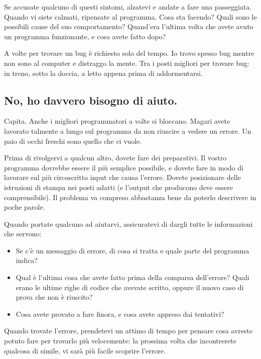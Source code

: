 \documentclass[10pt]{book}
\begin{document}
Se accusate qualcuno di questi sintomi, alzatevi e andate a fare una passeggiata. Quando vi siete calmati, ripensate al programma. Cosa sta facendo? Quali sono le possibili cause del suo comportamento? Quand'era l'ultima volta che avete avuto un programma funzionante, e cosa avete fatto dopo?

A volte per trovare un bug è richiesto solo del tempo. Io trovo spesso bug mentre non sono al computer e distraggo la mente. Tra i posti migliori per trovare bug: in treno, sotto la doccia, a letto appena prima di addormentarsi.


\subsection{No, ho davvero bisogno di aiuto.}

Capita. Anche i migliori programmatori a volte si bloccano. Magari avete lavorato talmente a lungo sul programma da non riuscire a vedere un errore. Un paio di occhi freschi sono quello che ci vuole.

Prima di rivolgervi a qualcun altro, dovete fare dei preparativi. Il vostro programma dovrebbe essere il più semplice possibile, e dovete fare in modo di lavorare sul più circoscritto input che causa l'errore.
Dovete posizionare delle istruzioni di stampa nei posti adatti (e l'output che producono deve essere comprensibile). Il problema va compreso abbastanza bene da poterlo descrivere in poche parole.

Quando portate qualcuno ad aiutarvi, assicuratevi di dargli tutte le informazioni che servono:

\begin{itemize}

\item Se c'è un messaggio di errore, di cosa si tratta e quale parte del programma indica?

\item Qual è l'ultima cosa che avete fatto prima della comparsa dell'errore? Quali erano le ultime righe di codice che avevate scritto, oppure il nuovo caso di prova che non è riuscito?

\item Cosa avete provato a fare finora, e cosa avete appreso dai tentativi?

\end{itemize}

Quando trovate l'errore, prendetevi un attimo di tempo per pensare cosa avreste potuto fare per trovarlo più velocemente: la prossima volta che incontrerete qualcosa di simile, vi sarà più facile scoprire l'errore.
\end{document}
